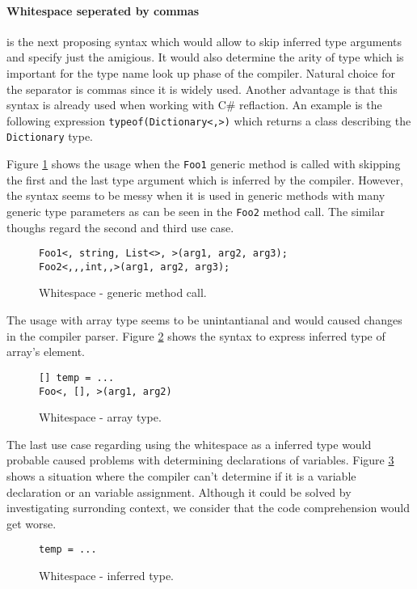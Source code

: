 \paragraph*{Whitespace seperated by commas} is the next proposing syntax which would allow to skip inferred type arguments and specify just the amigious.
It would also determine the arity of type which is important for the type name look up phase of the compiler.
Natural choice for the separator is commas since it is widely used.
Another advantage is that this syntax is already used when working with C\# reflaction.
An example is the following expression \texttt{typeof(Dictionary<,>)} which returns a class describing the \texttt{Dictionary} type.
\par
Figure \ref{img45:opW1} shows the usage when the \texttt{Foo1} generic method is called with skipping the first and the last type argument which is inferred by the compiler.
However, the syntax seems to be messy when it is used in generic methods with many generic type parameters as can be seen in the \texttt{Foo2} method call.
The similar thoughs regard the second and third use case.
\begin{figure}[h]
\begin{lstlisting}[style=csharp]
Foo1<, string, List<>, >(arg1, arg2, arg3);
Foo2<,,,int,,>(arg1, arg2, arg3);
\end{lstlisting}
\caption{Whitespace - generic method call.}
\label{img45:opW1}
\end{figure}
\par
The usage with array type seems to be unintantianal and would caused changes in the compiler parser. 
Figure \ref{img46:opW4} shows the syntax to express inferred type of array's element. 
\begin{figure}[h]
\begin{lstlisting}[style=csharp]
[] temp = ...
Foo<, [], >(arg1, arg2)
\end{lstlisting}
\caption{Whitespace - array type.}
\label{img46:opW4}
\end{figure}
\par
The last use case regarding using the whitespace as a inferred type would probable caused problems with determining declarations of variables.
Figure \ref{img47:opW5} shows a situation where the compiler can't determine if it is a variable declaration or an variable assignment.
Although it could be solved by investigating surronding context, we consider that the code comprehension would get worse.
\begin{figure}[h]
\begin{lstlisting}[style=csharp]
temp = ...
\end{lstlisting}
\caption{Whitespace - inferred type.}
\label{img47:opW5}
\end{figure}

